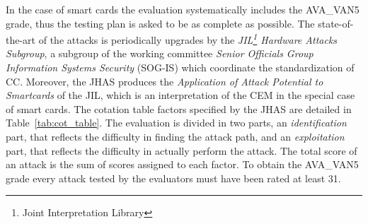 In the case of smart cards the evaluation systematically includes the AVA\_VAN5 grade, thus the testing plan is asked to be as complete as possible. The state-of-the-art of the attacks is periodically upgrades by the \emph{JIL\footnote{Joint Interpretation Library} Hardware Attacks Subgroup}, a subgroup of the working committee \emph{Senior Officials Group Information Systems Security} (SOG-IS) which coordinate the standardization of CC. Moreover, the JHAS produces the \emph{Application of Attack Potential to Smartcards} \cite{JIL} of the JIL, which is an interpretation of the CEM in the special case of smart cards. The cotation table factors specified by the JHAS are detailed in Table~\ref{tab:cot_table}. The evaluation is divided in two parts, an \emph{identification} part, that reflects the difficulty in finding the attack path, and an \emph{exploitation} part, that reflects the difficulty in actually perform the attack. The total score of an attack is the sum of scores assigned to each factor. To obtain the AVA\_VAN5 grade every attack tested by the evaluators must have been rated at least 31.\\



